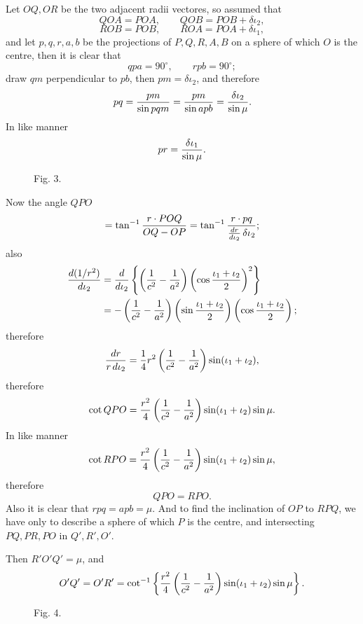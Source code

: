 \documentclass[11pt]{article}
\newcommand{\sourcepage}[1]{\marginpar{\scriptsize p.~#1}}
\newcommand{\figcaption}[1]{\par\smallskip\centerline{\small #1}\smallskip}
\begin{document}
\sourcepage{16}
Let $OQ,OR$ be the two adjacent radii vectores, so assumed that
\[
 QOA=POA,
 \qquad QOB=POB+\delta\iota_2,
\]
\[
 ROB=POB,
 \qquad ROA=POA+\delta\iota_1,
\]
and let $p,q,r,a,b$ be the projections of $P,Q,R,A,B$ on a sphere of which $O$ is the centre, then it is clear that
\[
 qpa=90^\circ,
 \qquad rpb=90^\circ;
\]
draw $qm$ perpendicular to $pb$, then $pm=\delta\iota_2$, and therefore
\[
 pq={pm\over\sin pqm}={pm\over\sin apb}={\delta\iota_2\over\sin\mu}.
\]
In like manner
\[
 pr={\delta\iota_1\over\sin\mu}.
\]
\begin{figure}[h]
\centering
{}
\figcaption{Fig. 3.}
\end{figure}
Now the angle $QPO$
\[
 =\tan^{-1}{r\cdot POQ\over OQ-OP}
 =\tan^{-1}{r\cdot pq\over {dr\over d\iota_2}\,\delta\iota_2};
\]
also
\begin{align*}
 {d(1/r^2)\over d\iota_2}
 &= {d\over d\iota_2}\left\{\left({1\over c^2}-{1\over a^2}\right)
       \left(\cos{\iota_1+\iota_2\over2}\right)^2\right\}\\
 &=-\left({1\over c^2}-{1\over a^2}\right)
       \left(\sin{\iota_1+\iota_2\over2}\right)
       \left(\cos{\iota_1+\iota_2\over2}\right);
\end{align*}
therefore
\[
 {dr\over r\,d\iota_2}={1\over4}r^2\left({1\over c^2}-{1\over a^2}\right)\sin(\iota_1+\iota_2),
\]
therefore
\[
 \cot QPO={r^2\over4}\left({1\over c^2}-{1\over a^2}\right)\sin(\iota_1+\iota_2)\sin\mu.
\]
In like manner
\[
 \cot RPO={r^2\over4}\left({1\over c^2}-{1\over a^2}\right)\sin(\iota_1+\iota_2)\sin\mu,
\]
therefore
\[
 QPO=RPO.
\]
Also it is clear that $rpq=apb=\mu$. And to find the inclination of $OP$ to $RPQ$, we have only to describe a sphere of which $P$ is the centre, and intersecting $PQ,PR,PO$ in $Q',R',O'$.

Then $R'O'Q'=\mu$, and
\[
 O'Q'=O'R'=\cot^{-1}\left\{ {r^2\over4}\left({1\over c^2}-{1\over a^2}\right)
 \sin(\iota_1+\iota_2)\sin\mu\right\}.
\]
\begin{figure}[h]
\centering
{}
\figcaption{Fig. 4.}
\end{figure}
\end{document}
